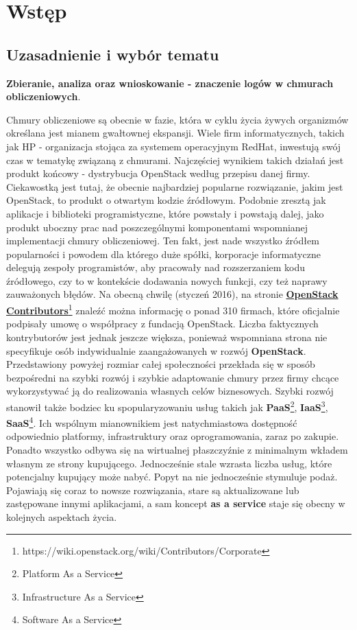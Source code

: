 \chapter[Wstęp]{Wstęp}
\label{chapter:introduction}

\section{Uzasadnienie i wybór tematu}

\textbf{Zbieranie, analiza oraz wnioskowanie - znaczenie logów w chmurach obliczeniowych}. 

Chmury obliczeniowe są obecnie w fazie, która w cyklu życia żywych organizmów określana jest mianem gwałtownej ekspansji. Wiele firm
informatycznych, takich jak HP - organizacja stojąca za systemem operacyjnym RedHat, inwestują swój czas w tematykę związaną z chmurami.
Najczęściej wynikiem takich działań jest produkt końcowy - dystrybucja OpenStack według przepisu danej firmy. Ciekawostką jest tutaj,
że obecnie najbardziej popularne rozwiązanie, jakim jest OpenStack, to produkt o otwartym kodzie źródłowym. Podobnie zresztą jak
aplikacje i biblioteki programistyczne, które powstały i powstają dalej, jako produkt uboczny prac nad poszczególnymi komponentami
wspomnianej implementacji chmury obliczeniowej. Ten fakt, jest nade wszystko źródłem popularności i powodem dla którego duże spółki, 
korporacje informatyczne delegują zespoły programistów, aby pracowały nad rozszerzaniem kodu źródłowego, czy to w kontekście
dodawania nowych funkcji, czy też naprawy zauważonych błędów. Na obecną chwilę (styczeń 2016), na stronie \href{https://wiki.openstack.org/wiki/Contributors/Corporate}{\textbf{OpenStack Contributors}}\footnote{https://wiki.openstack.org/wiki/Contributors/Corporate}
znaleźć można informację o ponad 310 firmach, które oficjalnie podpisały umowę o współpracy z fundacją OpenStack. Liczba faktycznych kontrybutorów
jest jednak jeszcze większa, ponieważ wspomniana strona nie specyfikuje osób indywidualnie zaangażowanych w rozwój \textbf{OpenStack}.
Przedstawiony powyżej rozmiar całej społeczności przekłada się w sposób bezpośredni na szybki rozwój i szybkie adaptowanie chmury przez firmy chcące wykorzystywać ją do realizowania własnych celów biznesowych. Szybki rozwój stanowił także bodziec ku spopularyzowaniu usług takich jak
\textbf{PaaS}\footnote{Platform As a Service},
\textbf{IaaS}\footnote{Infrastructure As a Service},
\textbf{SaaS}\footnote{Software As a Service}.
Ich wspólnym mianownikiem jest natychmiastowa dostępność odpowiednio platformy, infrastruktury oraz oprogramowania, zaraz po zakupie. Ponadto wszystko
odbywa się na wirtualnej płaszczyźnie z minimalnym wkładem własnym ze strony kupującego. Jednocześnie stale wzrasta liczba usług, które
potencjalny kupujący może nabyć. Popyt na nie jednocześnie stymuluje podaż. Pojawiają się coraz to nowsze rozwiązania, stare są aktualizowane lub
zastępowane innymi aplikacjami, a sam koncept \textbf{as a service} staje się obecny w kolejnych aspektach życia. 

